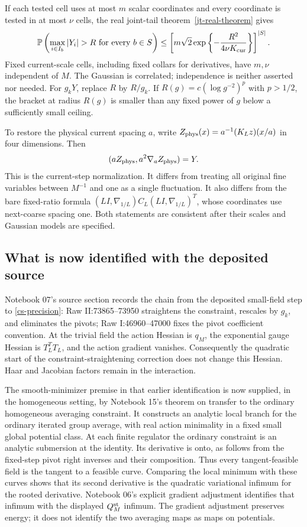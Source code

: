 If each tested cell uses at most $m$ scalar coordinates and every
coordinate is tested in at most $\nu$ cells, the real joint-tail
theorem~\ref{jt-real-theorem} gives
\begin{equation}\label{cs-joint-tail}
 \mathbb P\left(
 \max_{i\in I_b}|Y_i|>R\text{ for every }b\in S\right)
 \le
 \left[m\sqrt2\exp\left\{-\frac{R^2}{4\nu K_{\rm cur}}\right\}
 \right]^{|S|}.
\end{equation}
Fixed current-scale cells, including fixed collars for derivatives,
have $m,\nu$ independent of $M$. The Gaussian is correlated;
independence is neither asserted nor needed. For $g_kY$, replace
$R$ by $R/g_k$. If $R(g)=c(\log g^{-2})^p$ with $p>1/2$, the
bracket at radius $R(g)$ is smaller than any fixed power of $g$
below a sufficiently small ceiling.

To restore the physical current spacing $a$, write
$Z_{\rm phys}(x)=a^{-1}(K_Lz)(x/a)$ in four dimensions. Then
\[
 (aZ_{\rm phys},a^2\nabla_aZ_{\rm phys})=Y.
\]
This is the current-step normalization. It differs from treating
all original fine variables between $M^{-1}$ and one as a single
fluctuation. It also differs from the bare fixed-ratio formula
$(LI,\nabla_{1/L})C_L(LI,\nabla_{1/L})^T$, whose coordinates use
next-coarse spacing one. Both statements are consistent after their
scales and Gaussian models are specified.

\subsection{What is now identified with the deposited source}

Notebook 07's source section records the chain from the deposited
small-field step to \eqref{cs-precision}: Raw II:73865--73950
straightens the constraint, rescales by $g_k$, and eliminates the
pivots; Raw I:46960--47000 fixes the pivot coefficient convention.
At the trivial field the action Hessian is $q_M$, the exponential
gauge Hessian is $T_L^TT_L$, and the action gradient vanishes.
Consequently the quadratic start of the constraint-straightening
correction does not change this Hessian. Haar and Jacobian factors
remain in the interaction.

The smooth-minimizer premise in that earlier identification is now
supplied, in the homogeneous setting, by Notebook 15's theorem on
transfer to the ordinary homogeneous averaging constraint. It
constructs an analytic local branch for the ordinary iterated group
average, with real action minimality in a fixed small global
potential class. At each finite regulator the ordinary constraint
is an analytic submersion at the identity. Its derivative is onto,
as follows from the fixed-step pivot right inverses and their
composition. Thus every tangent-feasible field is the tangent to
a feasible curve. Comparing the local minimum with these curves
shows that its second derivative is the quadratic variational
infimum for the rooted derivative. Notebook 06's explicit
gradient adjustment identifies that infimum with the displayed
$Q_M^{\rm st}$ infimum. The gradient adjustment preserves energy;
it does not identify the two averaging maps as maps on potentials.

